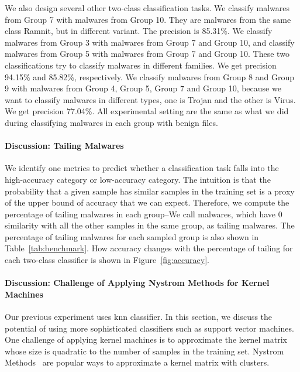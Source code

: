 We also design several other two-class classification tasks. 
We classify malwares from Group 7 with malwares from Group 10. 
They are malwares from the same class Ramnit, but in different variant. 
The precision is 85.31\%. 
We classify malwares from Group 3 with malwares from Group 7 and Group 10, 
and classify malwares from Group 5 with malwares from Group 7 and Group 10. 
These two classifications try to classify malwares in different families. 
We get precision 94.15\% and 85.82\%, respectively. 
We classify malwares from Group 8 and Group 9 with malwares from Group 4, Group 5, Group 7 and Group 10, 
because we want to classify malwares in different types, one is Trojan and the other is Virus. We get precision 77.04\%. 
All experimental setting are the same as what we did during classifying malwares in each group with benign files. 

\paragraph*{Discussion: Tailing Malwares}

We identify one metrics to predict whether
a classification task falls into the
high-accuracy category or low-accuracy
category. The intuition is that the probability
that a given sample has similar samples in
the training set is a proxy of the upper bound
of accuracy that we can expect. Therefore,
we compute the percentage of tailing malwares in each group--We call malwares, which have 0 similarity with all the other samples in the same group, as tailing malwares. 
The percentage of tailing malwares for each sampled group is also shown in Table~\ref{tab:benchmark}. 
How accuracy changes with the percentage of tailing for each two-class classifier is shown in Figure~\ref{fig:accuracy}. 


\paragraph*{Discussion: Challenge of Applying Nystrom Methods for Kernel Machines}

%


Our previous experiment uses knn classifier.
In this section, we discuss the potential of using
more sophisticated classifiers such as
support vector machines. One challenge
of applying kernel machines is to
approximate the kernel matrix whose
size is quadratic to the number of samples
in the training set. Nystrom Methods~\cite{clustering-purpose} are popular ways to
approximate a kernel matrix with clusters.

